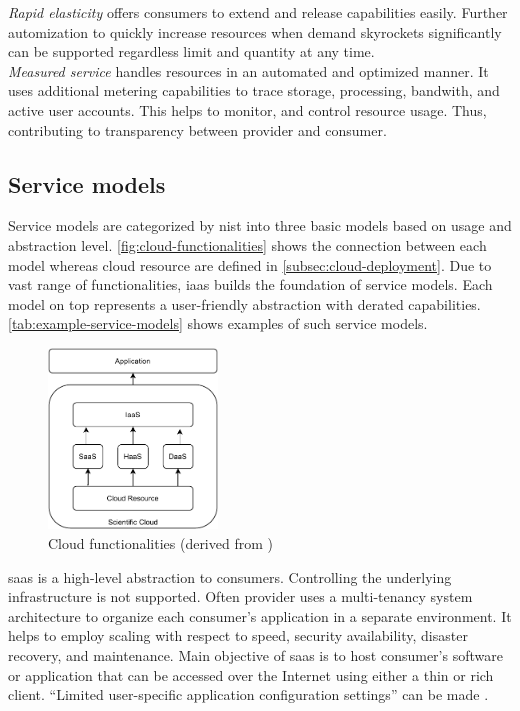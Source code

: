 \textit{Rapid elasticity} offers consumers to extend and release capabilities easily. Further automization to quickly increase resources  when demand skyrockets significantly can be supported regardless limit and quantity at any time.\\

\textit{Measured service} handles resources in an automated and optimized manner. It uses additional metering capabilities to trace storage, processing, bandwith, and active user accounts. This helps to monitor, and control resource usage. Thus, contributing to transparency between provider and consumer.

\subsection{Service models}
\label{subsec:cloud-service}

Service models are categorized by \ac{nist} into three basic models based on usage and abstraction level. \autoref{fig:cloud-functionalities} shows the connection between each model whereas cloud resource are defined in \autoref{subsec:cloud-deployment}. Due to vast range of functionalities, \ac*{iaas} builds the foundation of service models. Each model on top represents a user-friendly abstraction with derated capabilities. \autoref{tab:example-service-models} shows examples of such service models.

\begin{figure}[h]
    \centering
    \includegraphics[width=0.4\textwidth]{figures/cloud-functionalities.pdf}
    \caption{Cloud functionalities (derived from \cite{Wang2010})}
    \label{fig:cloud-functionalities}
\end{figure}

\ac{saas} is a high-level abstraction to consumers. Controlling the underlying infrastructure is not supported. Often provider uses a multi-tenancy system architecture to organize each consumer's application in a separate environment. It helps to employ scaling with respect to speed, security availability, disaster recovery, and maintenance. Main objective of \ac{saas} is to host consumer's software or application that can be accessed over the Internet using either a thin or rich client.\cite{Dillon2010} \enquote{Limited user-specific application configuration settings} can be made \cite{Mell2011}.\\


